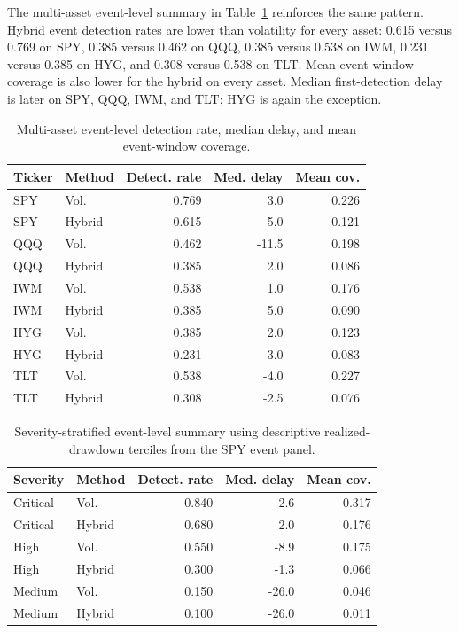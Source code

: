 \documentclass[10pt,twocolumn]{article}
\begin{document}
The multi-asset event-level summary in Table~\ref{tab:multiasset_event_level} reinforces the same pattern. Hybrid event detection rates are lower than volatility for every asset: 0.615 versus 0.769 on SPY, 0.385 versus 0.462 on QQQ, 0.385 versus 0.538 on IWM, 0.231 versus 0.385 on HYG, and 0.308 versus 0.538 on TLT. Mean event-window coverage is also lower for the hybrid on every asset. Median first-detection delay is later on SPY, QQQ, IWM, and TLT; HYG is again the exception.

\begin{table}[t]
\centering
\caption{Multi-asset event-level detection rate, median delay, and mean event-window coverage.}
\label{tab:multiasset_event_level}
\scriptsize
\begin{tabular}{llrrr}
\toprule
Ticker & Method & Detect. rate & Med. delay & Mean cov.\\
\midrule
SPY & Vol. & 0.769 & 3.0 & 0.226\\
SPY & Hybrid & 0.615 & 5.0 & 0.121\\
QQQ & Vol. & 0.462 & -11.5 & 0.198\\
QQQ & Hybrid & 0.385 & 2.0 & 0.086\\
IWM & Vol. & 0.538 & 1.0 & 0.176\\
IWM & Hybrid & 0.385 & 5.0 & 0.090\\
HYG & Vol. & 0.385 & 2.0 & 0.123\\
HYG & Hybrid & 0.231 & -3.0 & 0.083\\
TLT & Vol. & 0.538 & -4.0 & 0.227\\
TLT & Hybrid & 0.308 & -2.5 & 0.076\\
\bottomrule
\end{tabular}
\end{table}

\begin{table}[t]
\centering
\caption{Severity-stratified event-level summary using descriptive realized-drawdown terciles from the SPY event panel.}
\label{tab:event_level_severity}
\scriptsize
\begin{tabular}{llrrr}
\toprule
Severity & Method & Detect. rate & Med. delay & Mean cov.\\
\midrule
Critical & Vol. & 0.840 & -2.6 & 0.317\\
Critical & Hybrid & 0.680 & 2.0 & 0.176\\
High & Vol. & 0.550 & -8.9 & 0.175\\
High & Hybrid & 0.300 & -1.3 & 0.066\\
Medium & Vol. & 0.150 & -26.0 & 0.046\\
Medium & Hybrid & 0.100 & -26.0 & 0.011\\
\bottomrule
\end{tabular}
\end{table}
\end{document}
